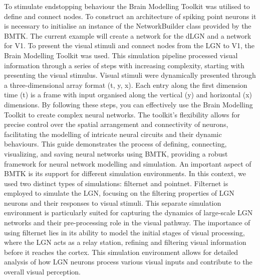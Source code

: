 \documentclass[12pt]{article}
\begin{document}
\bigbreak
To stimulate endstopping behaviour the Brain Modelling Toolkit was utilised to define and connect nodes. To construct an architecture of spiking point neurons it is necessary to initialise an instance of the NetworkBuilder class provided by the BMTK. The current example will create a network for the dLGN and a network for V1. To present the visual stimuli and connect nodes from the LGN to V1, the Brain Modelling Toolkit was used. This simulation pipeline processed visual information through a series of steps with increasing complexity, starting with presenting the visual stimulus. Visual stimuli were dynamically presented through a three-dimensional array format (t, y, x). Each entry along the first dimension time (t) is a frame with input organised along the vertical (y) and horizontal (x) dimensions. By following these steps, you can effectively use the Brain Modelling Toolkit to create complex neural networks. The toolkit's flexibility allows for precise control over the spatial arrangement and connectivity of neurons, facilitating the modelling of intricate neural circuits and their dynamic behaviours. This guide demonstrates the process of defining, connecting, visualizing, and saving neural networks using BMTK, providing a robust framework for neural network modelling and simulation. An important aspect of BMTK is its support for different simulation environments. In this context, we used two distinct types of simulations: filternet and pointnet. Filternet is employed to simulate the LGN, focusing on the filtering properties of LGN neurons and their responses to visual stimuli. This separate simulation environment is particularly suited for capturing the dynamics of large-scale LGN networks and their pre-processing role in the visual pathway. The importance of using filternet lies in its ability to model the initial stages of visual processing, where the LGN acts as a relay station, refining and filtering visual information before it reaches the cortex. This simulation environment allows for detailed analysis of how LGN neurons process various visual inputs and contribute to the overall visual perception.
\bigbreak
\end{document}
